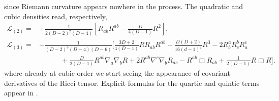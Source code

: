 \documentclass[11pt]{article}
\begin{document}
{since Riemann curvature appears nowhere in the process. The quadratic and cubic densities read, respectively, \cite{Kraus:1999di,Emparan:1999pm,Balasubramanian:1999re,Papadimitriou:2004ap,Papadimitriou:2010as,Elvang:2016tzz,Bueno:2022log,Anastasiou:2020zwc}
\begin{align}
    \mathcal{L}_{(2)}=   &  +\frac{1}{2(D-2)^2(D-4)} \left[ R_{ab}R^{ab} - \frac{D}{4(D-1)} R^2 \right] ,  \label{quada} \\ \label{cubi}
    \mathcal{L}_{(3)} %
   =& - \frac{1}{(D-2)^3(D-4)(D-6)} \Bigg[ \frac{3D+2}{4(D-1)}RR_{ab}R^{ab} - \frac{D(D+2)}{16(d-1)^2}R^3 - 2R^{a}_b R^{b}_c R^{c}_a \nonumber \\
    &\qquad\quad + \frac{D}{2(D-1)}R^{ab}\nabla_{a}\nabla_{b} R + 2 R^{ab}\nabla^c\nabla_b R_{ac} - R^{ab} \Box R_{ab} + \frac{1}{2(D-1)} R \Box R \Bigg].
\end{align}
where already at cubic order we start seeing the appearance of covariant derivatives of the Ricci tensor. Explicit formulas for the quartic and quintic terms appear in \cite{Bueno:2022log}.



}
\end{document}
